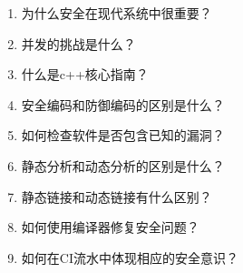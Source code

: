 \begin{enumerate}
\item
为什么安全在现代系统中很重要？

\item
并发的挑战是什么？

\item
什么是c++核心指南？

\item
安全编码和防御编码的区别是什么？

\item
如何检查软件是否包含已知的漏洞？

\item
静态分析和动态分析的区别是什么？

\item
静态链接和动态链接有什么区别？

\item
如何使用编译器修复安全问题？

\item
如何在CI流水中体现相应的安全意识？
\end{enumerate}